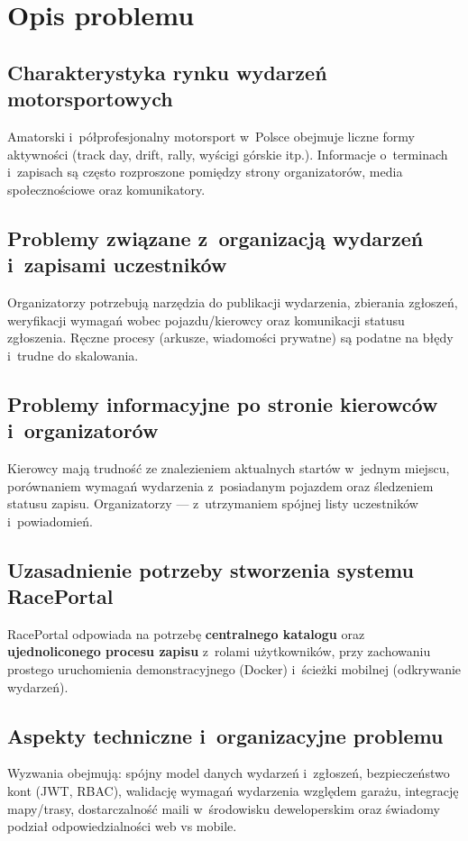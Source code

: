 \documentclass{sprz}
\begin{document}
\chapter{Opis problemu}
\section{Charakterystyka rynku wydarzeń motorsportowych}
Amatorski i~półprofesjonalny motorsport w~Polsce obejmuje liczne formy aktywności (track day, drift, rally, wyścigi górskie itp.). Informacje o~terminach i~zapisach są często rozproszone pomiędzy strony organizatorów, media społecznościowe oraz komunikatory.

\section{Problemy związane z~organizacją wydarzeń i~zapisami uczestników}
Organizatorzy potrzebują narzędzia do publikacji wydarzenia, zbierania zgłoszeń, weryfikacji wymagań wobec pojazdu/kierowcy oraz komunikacji statusu zgłoszenia. Ręczne procesy (arkusze, wiadomości prywatne) są podatne na błędy i~trudne do skalowania.

\section{Problemy informacyjne po stronie kierowców i~organizatorów}
Kierowcy mają trudność ze znalezieniem aktualnych startów w~jednym miejscu, porównaniem wymagań wydarzenia z~posiadanym pojazdem oraz śledzeniem statusu zapisu. Organizatorzy --- z~utrzymaniem spójnej listy uczestników i~powiadomień.

\section{Uzasadnienie potrzeby stworzenia systemu RacePortal}
RacePortal odpowiada na potrzebę \textbf{centralnego katalogu} oraz \textbf{ujednoliconego procesu zapisu} z~rolami użytkowników, przy zachowaniu prostego uruchomienia demonstracyjnego (Docker) i~ścieżki mobilnej (odkrywanie wydarzeń).

\section{Aspekty techniczne i~organizacyjne problemu}
Wyzwania obejmują: spójny model danych wydarzeń i~zgłoszeń, bezpieczeństwo kont (JWT, RBAC), walidację wymagań wydarzenia względem garażu, integrację mapy/trasy, dostarczalność maili w~środowisku deweloperskim oraz świadomy podział odpowiedzialności web vs mobile.
\end{document}
